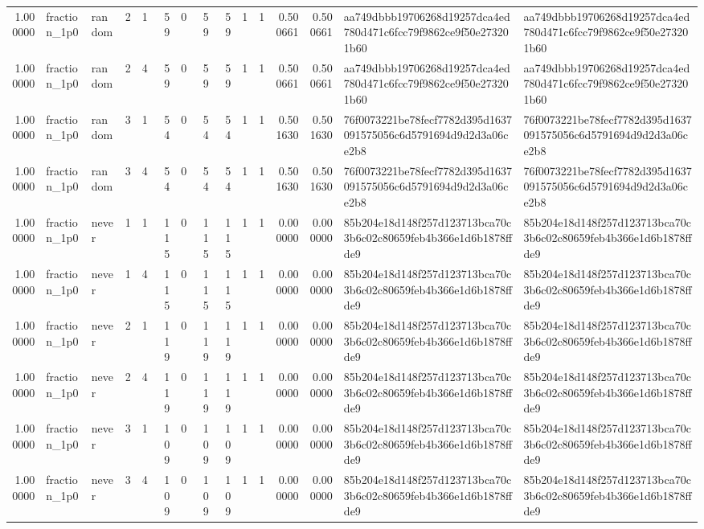 \begin{tabular}{rllrrrrrrrrrrll}
1.000000 & fraction\_1p0 & random & 2 & 1 & 59 & 0 & 59 & 59 & 1 & 1 & 0.500661 & 0.500661 & aa749dbbb19706268d19257dca4ed780d471c6fcc79f9862ce9f50e273201b60 & aa749dbbb19706268d19257dca4ed780d471c6fcc79f9862ce9f50e273201b60 \\
1.000000 & fraction\_1p0 & random & 2 & 4 & 59 & 0 & 59 & 59 & 1 & 1 & 0.500661 & 0.500661 & aa749dbbb19706268d19257dca4ed780d471c6fcc79f9862ce9f50e273201b60 & aa749dbbb19706268d19257dca4ed780d471c6fcc79f9862ce9f50e273201b60 \\
1.000000 & fraction\_1p0 & random & 3 & 1 & 54 & 0 & 54 & 54 & 1 & 1 & 0.501630 & 0.501630 & 76f0073221be78fecf7782d395d1637091575056c6d5791694d9d2d3a06ce2b8 & 76f0073221be78fecf7782d395d1637091575056c6d5791694d9d2d3a06ce2b8 \\
1.000000 & fraction\_1p0 & random & 3 & 4 & 54 & 0 & 54 & 54 & 1 & 1 & 0.501630 & 0.501630 & 76f0073221be78fecf7782d395d1637091575056c6d5791694d9d2d3a06ce2b8 & 76f0073221be78fecf7782d395d1637091575056c6d5791694d9d2d3a06ce2b8 \\
1.000000 & fraction\_1p0 & never & 1 & 1 & 115 & 0 & 115 & 115 & 1 & 1 & 0.000000 & 0.000000 & 85b204e18d148f257d123713bca70c3b6c02c80659feb4b366e1d6b1878ffde9 & 85b204e18d148f257d123713bca70c3b6c02c80659feb4b366e1d6b1878ffde9 \\
1.000000 & fraction\_1p0 & never & 1 & 4 & 115 & 0 & 115 & 115 & 1 & 1 & 0.000000 & 0.000000 & 85b204e18d148f257d123713bca70c3b6c02c80659feb4b366e1d6b1878ffde9 & 85b204e18d148f257d123713bca70c3b6c02c80659feb4b366e1d6b1878ffde9 \\
1.000000 & fraction\_1p0 & never & 2 & 1 & 119 & 0 & 119 & 119 & 1 & 1 & 0.000000 & 0.000000 & 85b204e18d148f257d123713bca70c3b6c02c80659feb4b366e1d6b1878ffde9 & 85b204e18d148f257d123713bca70c3b6c02c80659feb4b366e1d6b1878ffde9 \\
1.000000 & fraction\_1p0 & never & 2 & 4 & 119 & 0 & 119 & 119 & 1 & 1 & 0.000000 & 0.000000 & 85b204e18d148f257d123713bca70c3b6c02c80659feb4b366e1d6b1878ffde9 & 85b204e18d148f257d123713bca70c3b6c02c80659feb4b366e1d6b1878ffde9 \\
1.000000 & fraction\_1p0 & never & 3 & 1 & 109 & 0 & 109 & 109 & 1 & 1 & 0.000000 & 0.000000 & 85b204e18d148f257d123713bca70c3b6c02c80659feb4b366e1d6b1878ffde9 & 85b204e18d148f257d123713bca70c3b6c02c80659feb4b366e1d6b1878ffde9 \\
1.000000 & fraction\_1p0 & never & 3 & 4 & 109 & 0 & 109 & 109 & 1 & 1 & 0.000000 & 0.000000 & 85b204e18d148f257d123713bca70c3b6c02c80659feb4b366e1d6b1878ffde9 & 85b204e18d148f257d123713bca70c3b6c02c80659feb4b366e1d6b1878ffde9 \\
\bottomrule
\end{tabular}
